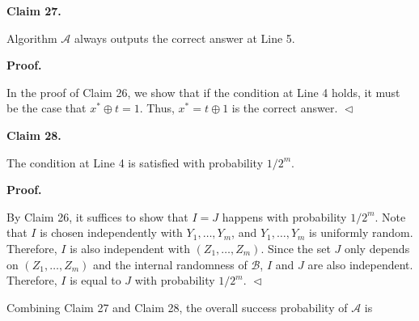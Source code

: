 

\par\medskip\noindent\textbf{
Claim 27. 
}\par



Algorithm $\mathcal{A}$ always outputs the correct answer at Line 5.\par







\par\medskip\noindent\textbf{
\textbf{Proof}.}\par




In the proof of Claim 26, we show that if the condition at Line 4 holds, it must be the case that $x^{*}\oplus t=1$. Thus, $x^{*}=t\oplus 1$ is the correct answer.
$\vartriangleleft$\par





\par\medskip\noindent\textbf{
Claim 28. 
}\par



The condition at Line 4 is satisfied with probability $1/2^{m}$.\par







\par\medskip\noindent\textbf{
\textbf{Proof}.}\par




By Claim 26, it suffices to show that $I=J$ happens with probability $1/2^{m}$.
Note that $I$ is chosen independently with $Y_{1},\ldots,Y_{m}$, and $Y_{1},\ldots,Y_{m}$ is uniformly random. Therefore, $I$ is also independent with $(Z_{1},\ldots,Z_{m})$.
Since the set $J$ only depends on $(Z_{1},\ldots,Z_{m})$ and the internal randomness of $\mathcal{B}$, $I$ and $J$ are also independent. Therefore, $I$ is equal to $J$ with probability $1/2^{m}$.
$\vartriangleleft$\par




Combining Claim 27 and Claim 28, the overall success probability of $\mathcal{A}$ is\par


